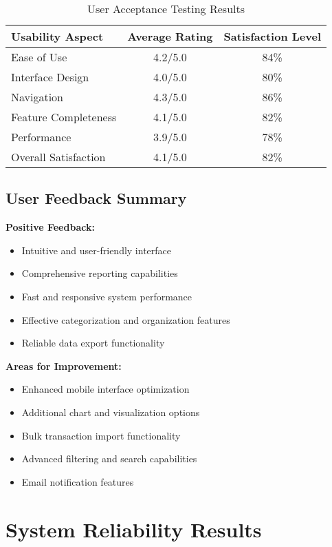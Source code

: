 \begin{table}[h]
\centering
\begin{tabular}{|l|c|c|}
\hline
\textbf{Usability Aspect} & \textbf{Average Rating} & \textbf{Satisfaction Level} \\
\hline
Ease of Use & 4.2/5.0 & 84\% \\
\hline
Interface Design & 4.0/5.0 & 80\% \\
\hline
Navigation & 4.3/5.0 & 86\% \\
\hline
Feature Completeness & 4.1/5.0 & 82\% \\
\hline
Performance & 3.9/5.0 & 78\% \\
\hline
Overall Satisfaction & 4.1/5.0 & 82\% \\
\hline
\end{tabular}
\caption{User Acceptance Testing Results}
\end{table}

\subsection{User Feedback Summary}

\textbf{Positive Feedback:}
\begin{itemize}
    \item Intuitive and user-friendly interface
    \item Comprehensive reporting capabilities
    \item Fast and responsive system performance
    \item Effective categorization and organization features
    \item Reliable data export functionality
\end{itemize}

\textbf{Areas for Improvement:}
\begin{itemize}
    \item Enhanced mobile interface optimization
    \item Additional chart and visualization options
    \item Bulk transaction import functionality
    \item Advanced filtering and search capabilities
    \item Email notification features
\end{itemize}

\section{System Reliability Results}

